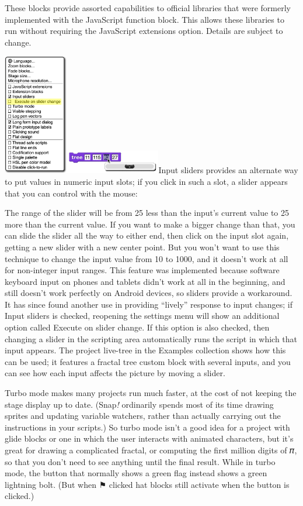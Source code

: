 These blocks provide assorted capabilities to official libraries that
were formerly implemented with the JavaScript function block. This
allows these libraries to run without requiring the JavaScript
extensions option. Details are subject to change.

\includegraphics[width=1.10486in,height=2.08333in]{media/image1023.png}\includegraphics[width=1.63889in,height=0.41319in]{media/image1024.png}Input
sliders provides an alternate way to put values in numeric input slots;
if you click in such a slot, a slider appears that you can control with
the mouse:

The range of the slider will be from 25 less than the input's current
value to 25 more than the current value. If you want to make a bigger
change than that, you can slide the slider all the way to either end,
then click on the input slot again, getting a new slider with a new
center point. But you won't want to use this technique to change the
input value from 10 to 1000, and it doesn't work at all for non-integer
input ranges. This feature was implemented because software keyboard
input on phones and tablets didn't work at all in the beginning, and
still doesn't work perfectly on Android devices, so sliders provide a
workaround. It has since found another use in providing ``lively''
response to input changes; if Input sliders is checked, reopening the
settings menu will show an additional option called Execute on slider
change. If this option is also checked, then changing a slider in the
scripting area automatically runs the script in which that input
appears. The project live-tree in the Examples collection shows how this
can be used; it features a fractal tree custom block with several
inputs, and you can see how each input affects the picture by moving a
slider.

Turbo mode makes many projects run much faster, at the cost of not
keeping the stage display up to date. (Snap\emph{!} ordinarily spends
most of its time drawing sprites and updating variable watchers, rather
than actually carrying out the instructions in your scripts.) So turbo
mode isn't a good idea for a project with glide blocks or one in which
the user interacts with animated characters, but it's great for drawing
a complicated fractal, or computing the first million digits of 𝜋, so
that you don't need to see anything until the final result. While in
turbo mode, the button that normally shows a green flag instead shows a
green lightning bolt. (But when ⚑ clicked hat blocks still activate when
the button is clicked.)

